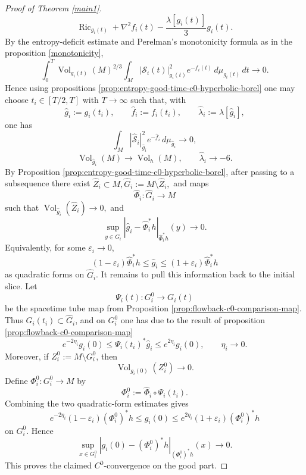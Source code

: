 \documentclass{amsart}
\begin{document}
\begin{proof}[Proof of Theorem \ref{main1}]
\[        \operatorname{Ric}_{g_i(t)}
        +
        \nabla^2 f_i(t)
        -
        \frac{\lambda[g_i(t)]}{3}g_i(t).
\]
By the entropy-deficit estimate and Perelman's monotonicity formula as in the proposition \ref{monotonicity},
\[
        \int_0^T
        \operatorname{Vol}_{g_i(t)}(M)^{2/3}
        \int_M
        |\mathcal S_i(t)|_{g_i(t)}^2
        e^{-f_i(t)}\,d\mu_{g_i(t)}\,dt
        \to0.
\]
Hence using propositions \ref{prop:entropy-good-time-c0-hyperbolic-borel} one may choose
$t_i\in[T/2,T]$ with $T\to\infty$
such that, with
\[
        \widehat g_i:=g_i(t_i),
        \qquad
        \widehat f_i:=f_i(t_i),
        \qquad
        \widehat\lambda_i:=\lambda[\widehat g_i],
\]
one has
\[
        \int_M
        |\widehat{\mathcal S}_i|_{\widehat g_i}^2
        e^{-\widehat f_i}\,d\mu_{\widehat g_i}
        \to0,
\]
\[
        \operatorname{Vol}_{\widehat g_i}(M)\to\operatorname{Vol}_{h}(M),
        \qquad
        \widehat\lambda_i\to -6.
\]
\noindent By Proposition \ref{prop:entropy-good-time-c0-hyperbolic-borel}, after
passing to a subsequence there exist 
$\widehat Z_i\subset M,  
        \widehat G_i:=M\setminus \widehat Z_i,
$
and maps
\[
        \widehat\Phi_i:\widehat G_i\longrightarrow M
\]
such that
$\operatorname{Vol}_{\widehat g_i}(\widehat Z_i)\to0,$
and
\[
        \sup_{y\in \widehat G_i}
        \left|
        \widehat g_i-\widehat\Phi_i^*h
        \right|_{\widehat\Phi_i^*h}(y)
        \to0.
\]
Equivalently, for some \(\varepsilon_i\to0\),
\[
        (1-\varepsilon_i)\widehat\Phi_i^*h
        \leq
        \widehat g_i
        \leq
        (1+\varepsilon_i)\widehat\Phi_i^*h
\]
as quadratic forms on \(\widehat G_i\). It remains to pull this information back to the initial slice.  Let
\[
        \Psi_i(t):G_i^0\longrightarrow G_i(t)
\]
be the spacetime tube map from Proposition
\ref{prop:flowback-c0-comparison-map}.  Thus \(G_i(t_i)\subset\widehat G_i\),
and on \(G_i^0\) one has due to the result of proposition \ref{prop:flowback-c0-comparison-map}
\[
        e^{-2\eta_i}g_i(0)
        \leq
        \Psi_i(t_i)^*\widehat g_i
        \leq
        e^{2\eta_i}g_i(0),
        \qquad
        \eta_i\to0.
\]
Moreover, if $Z_i^0:=M\setminus G_i^0$,
then
\[
        \operatorname{Vol}_{g_i(0)}(Z_i^0)\to0.
\]
Define
$\Phi_i^0:G_i^0\longrightarrow M$ by
\[
        \Phi_i^0
        :=
        \widehat\Phi_i\circ\Psi_i(t_i).
\]
Combining the two quadratic-form estimates gives
\[
        e^{-2\eta_i}(1-\varepsilon_i)(\Phi_i^0)^*h
        \leq
        g_i(0)
        \leq
        e^{2\eta_i}(1+\varepsilon_i)(\Phi_i^0)^*h
\]
on \(G_i^0\).  Hence
\[
        \sup_{x\in G_i^0}
        \left|
        g_i(0)-(\Phi_i^0)^*h
        \right|_{(\Phi_i^0)^*h}(x)
        \to0.
\]
This proves the claimed \(C^0\)-convergence on the good part.
\end{proof}
\end{document}
